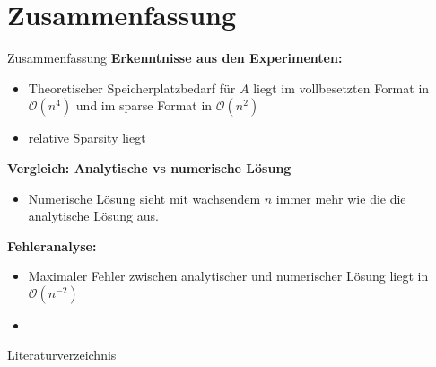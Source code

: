 \documentclass[9pt, t]{beamer}
\begin{document}
\section{Zusammenfassung}

\begin{frame}{Zusammenfassung}
    \textbf{Erkenntnisse aus den Experimenten:}
    \begin{itemize}
        \item Theoretischer Speicherplatzbedarf für \(A\) liegt im vollbesetzten Format in
        \(\mathcal{O}(n^4)\) und im sparse Format in \(\mathcal{O}(n^2)\) 
        \item relative Sparsity liegt 
    \end{itemize}

    \textbf{Vergleich: Analytische vs numerische Lösung}
    \begin{itemize}
        \item Numerische Lösung sieht mit wachsendem \(n\) immer mehr wie die
        die analytische Lösung aus.
    \end{itemize}

    \textbf{Fehleranalyse:}
    \begin{itemize}
        \item Maximaler Fehler zwischen analytischer und numerischer Lösung liegt
        in \(\mathcal{O}(n^{-2})\)
        \item 
    \end{itemize}
\end{frame}



\begin{frame}{Literaturverzeichnis}
    \printbibliography
\end{frame}
\end{document}
